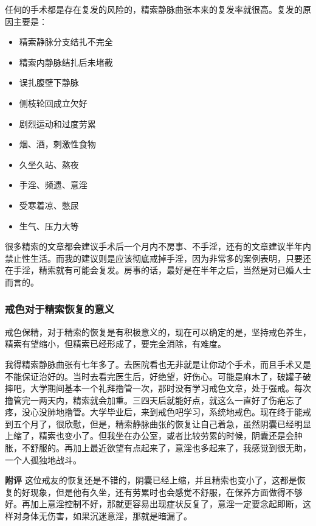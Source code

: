 任何的手术都是存在复发的风险的，精索静脉曲张本来的复发率就很高。复发的原因主要是：

\begin{multicols}{3}
    \begin{itemize}
        \item 精索静脉分支结扎不完全
        \item 精索内静脉结扎后未堵截
        \item 误扎腹壁下静脉
        \item 侧枝轮回成立欠好
        \item 剧烈运动和过度劳累
        \item 烟、酒，刺激性食物
        \item 久坐久站、熬夜
        \item 手淫、频遗、意淫
        \item 受寒着凉、憋尿
        \item 生气、压力大等
    \end{itemize}
\end{multicols}

很多精索的文章都会建议手术后一个月内不房事、不手淫，还有的文章建议半年内禁止性生活。而我的建议则是应该彻底戒掉手淫，因为非常多的案例表明，只要还在手淫，精索就有可能会复发。房事的话，最好是在半年之后，当然是对已婚人士而言的。

\subsubsection{戒色对于精索恢复的意义}

戒色保精，对于精索的恢复是有积极意义的，现在可以确定的是，坚持戒色养生，精索有望缩小，但精索已经形成了，要完全消除，有难度。

\begin{case}[精索静脉曲张]
    我得精索静脉曲张有七年多了。去医院看也无非就是让你动个手术，而且手术又是不能保证治好的。当时去看完医生后，好绝望，好伤心。可能是麻木了，破罐子破摔吧，大学期间基本一个礼拜撸管一次，那时没有学习戒色文章，处于强戒。每次撸管完一两天内，精索就会加重。三四天后就能好点，就这么一直好了伤疤忘了疼，没心没肺地撸管。大学毕业后，来到戒色吧学习，系统地戒色。现在终于能戒到五个月了，很欣慰，但是，精索静脉曲张的恢复让自己着急，虽然阴囊已经明显上缩了，精索也变小了。但我坐在办公室，或者比较劳累的时候，阴囊还是会肿胀，不舒服的。再加上最近欲望有点起来了，意淫也多起来了，我感觉到很无助，一个人孤独地战斗。

    \textbf{附评} 这位戒友的恢复还是不错的，阴囊已经上缩，并且精索也变小了，这都是恢复的好现象，但是他有久坐，还有劳累时也会感觉不舒服，在保养方面做得不够好。再加上意淫控制不好，那就更容易出现症状反复了，意淫一定要念起即断，这样对身体无伤害，如果沉迷意淫，那就是暗漏了。
\end{case}

